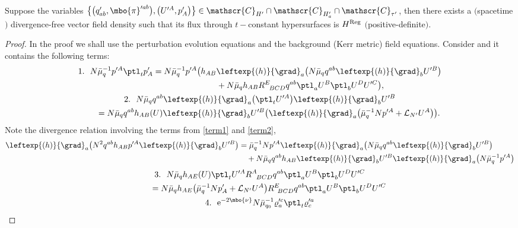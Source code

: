 \begin{Theorem}
Suppose the variables $\bigl\{ \bigl(q'_{ab}, \mbo{\pi}'^{ab}\bigr), \bigl(U'^A, p'_A\bigr) \bigr\} \in \mathscr{C}_{H'} \cap \mathscr{C}_{H'_a} \cap \mathscr{C}_{\tau'}$, then there exists a $($spacetime$)$ divergence-free vector field density such that its flux through $t-$constant hypersurfaces is $H^{{\rm Reg}}$ $($positive-definite$)$.
\end{Theorem}
\begin{proof}
In the proof we shall use the perturbation evolution equations and the background (Kerr metric) field equations. Consider  and it contains the following terms:
\begin{gather}
1. \ \ N \bar{\mu}^{-1}_q p'^A \ptl_t p'_A= N \bar{\mu}^{-1}_q p'^A \bigl(h_{AB} \leftexp{(h)}{\grad}_a \bigl(N \bar{\mu}_q q^{ab} \leftexp{(h)}{\grad}_b U'^B\bigr) \notag\\
\hphantom{1. \ N \bar{\mu}^{-1}_q p'^A \ptl_t p'_A=}{} + N \bar{\mu}_q h_{AB} R^E_{\,\,\,\, BCD} q^{ab} \ptl_a U^B \ptl_b U^D U'^C \bigr),\label{term1}
\\
2. \ \ N \bar{\mu}_q q^{ab} \leftexp{(h)}{\grad}_a \bigl(\ptl_t U'^A\bigr) \leftexp{(h)}{\grad}_b U'^B \notag\\
 \qquad{}= N \bar{\mu}_q q^{ab} h_{AB}(U) \leftexp{(h)}{\grad}_b U'^B \bigl(\leftexp{(h)}{\grad}_a \bigl(\bar{\mu}^{-1}_q Np'^A + \mathcal{L}_{N'} U^A\bigr)\bigr).\label{term2}
 \end{gather}
 Note the divergence relation involving the terms from \eqref{term1} and \eqref{term2},
 \begin{align*}
 \leftexp{(h)}{\grad}_a \bigl(N^2 q^{ab} h_{AB} p'^A \leftexp{(h)}{\grad}_b U'^B\bigr) &{}= \bar{\mu}^{-1}_q N p'^A \leftexp{(h)}{\grad}_a \bigl(N \bar{\mu}_q q^{ab} \leftexp{(h)}{\grad}_b U'^B\bigr) \notag\\
 & \quad{}+ N \bar{\mu}_q q^{ab} h_{AB} \leftexp{(h)}{\grad}_b U'^B \leftexp{(h)}{\grad}_a \bigl(N \bar{\mu}^{-1}_q p'^A\bigr)
 \end{align*}
\begin{gather*}
3. \ \ N \bar{\mu}_q h_{AE}(U) \ptl_t U'^A R^A_{\,\,\,\,BCD} q^{ab} \ptl_a U^B \ptl_b U^D U'^C \notag\\
 \qquad{}=N \bar{\mu}_q h_{AE} \bigl(\bar{\mu}^{-1}_q N p'_A + \mathcal{L}_{N'} U^A\bigr) R^E_{\,\,\,BCD} q^{ab} \ptl_a U^B \ptl_b U^D U'^C
\\
 4. \ \ {\rm e}^{-2 \mbo{\nu}} N \bar{\mu}^{-1}_{q_0} \varrho'^c_a \ptl_t \varrho'^a_c \\

\end{gather*}
\end{proof}
